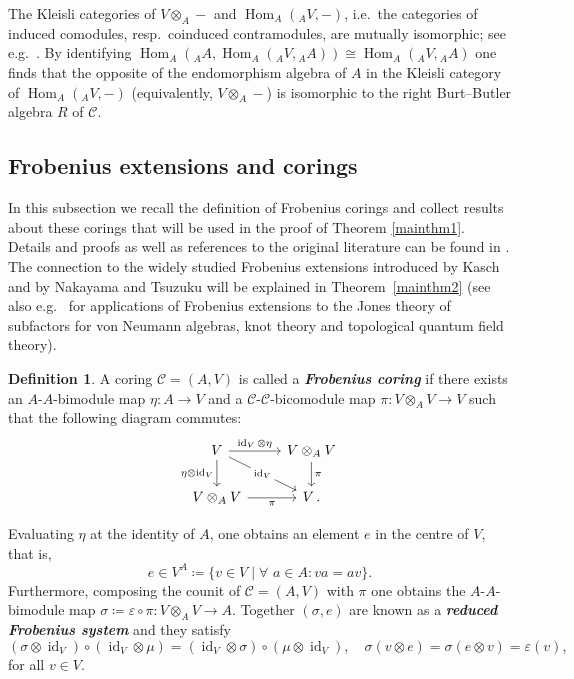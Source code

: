 \documentclass[12pt,a4paper]{amsart}
\theoremstyle{plain}
\theoremstyle{definition}
\newtheorem{defn}[thm]{Definition}
\numberwithin{equation}{thm}
\newcommand{\emphbf}[1]{\emph{\textbf{#1}}}
\DeclareMathOperator{\id}{id}
\DeclareMathOperator{\Hom}{Hom}
\begin{document}
The Kleisli categories of $V\otimes_A -$ and $\Hom_A ({}_AV,-)$, i.e.\ the categories of induced comodules, resp.\ coinduced contramodules, are mutually isomorphic; see e.g.\ \cite[3.9]{BBW09}. 
By identifying $\Hom_A({}_AA,\Hom_A(_AV,{}_AA))\cong \Hom_A(_AV,{}_AA)$ one finds that the opposite of the  endomorphism algebra of $A$ in the Kleisli category of $\Hom_A ({}_AV,-)$ (equivalently, $V\otimes_A -$) is isomorphic to the  right Burt--Butler algebra $R$ of $\mathcal{C}$. 



\subsection{Frobenius extensions and corings}

In this subsection we recall the definition of Frobenius corings \cite{Brz03}
and collect results about these corings that will be used in the proof of
Theorem \ref{mainthm1}. Details and proofs as well as references to the
original literature can be found in \cite[Section 27]{BW03}. The connection
to the widely studied Frobenius extensions introduced by Kasch \cite{Kas54} and by Nakayama and Tsuzuku \cite{NT59} will be explained in Theorem~\ref{mainthm2} (see also e.g.\ \cite{Kad99} for applications of Frobenius extensions to the Jones theory of subfactors for von Neumann algebras, knot theory and topological quantum field theory). 

\begin{defn}
\label{defn:Frobenius_coring}
  A coring $\mathcal{C}=(A,V)$ is called a \emphbf{Frobenius coring} if there exists an
  $A$-$A$-bimodule map $\eta\colon A \rightarrow V$ and a $\mathcal{C}$-$\mathcal{C}$-bicomodule map
  $\pi\colon V \otimes_A V \rightarrow V$ such that 
the following diagram commutes:
\[\begin{tikzcd}
V\arrow{r}{\id_V\otimes \eta}\arrow{d}[swap]{\eta\otimes \id_V}\arrow{rd}[description]{\id_V}&V\otimes_A V\arrow{d}{\pi}\\
V\otimes_A V\arrow{r}[swap]{\pi}&V\,.
\end{tikzcd}\]
\end{defn}
Evaluating $\eta$ at the identity of $A$, one obtains an element $e$ in the centre of $V$, that is,
\[
e \in V^A \coloneq\{v\in V\;|\; \forall\,\, a\in A: va=av\}.
\]
Furthermore, composing the counit of $\mathcal{C}=(A,V)$ with $\pi$ one obtains the $A$-$A$-bimodule map $\sigma\coloneq \varepsilon \circ\pi\colon  V\otimes_AV\to A$.  Together $(\sigma,e)$ are known as a \emphbf{reduced Frobenius system} and they satisfy
\begin{equation}\label{red.Frob}
    (\sigma \otimes \id_V)\circ (\id_V\otimes \mu) = (\id_V\otimes \sigma)\circ (\mu\otimes \id_V), \quad \sigma(v\otimes e)=\sigma(e\otimes v) = \varepsilon(v), 
\end{equation}
for all $v\in V$.
\end{document}
